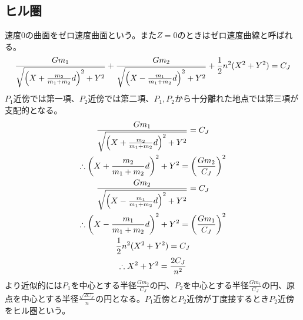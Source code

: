 	\subsection{ヒル圏}%
		速度0の曲面をゼロ速度曲面という。また$Z = 0$のときはゼロ速度曲線と呼ばれる。
		\begin{align*}
			\frac{Gm_1}{\sqrt{\left(X + \frac{m_2}{m_1 + m_2}d \right)^2 + Y^2}} + \frac{Gm_2}{\sqrt{\left(X - \frac{m_1}{m_1 + m_2}d \right)^2 + Y^2}} + \frac{1}{2}n^2(X^2 + Y^2) = C_J\\
		\end{align*}
		$P_1$近傍では第一項、$P_2$近傍では第二項、$P_1,P_2$から十分離れた地点では第三項が支配的となる。
		\begin{gather*}
			\frac{Gm_1}{\sqrt{\left(X + \frac{m_2}{m_1 + m_2}d \right)^2 + Y^2}} = C_J\\
			\therefore \left(X + \frac{m_2}{m_1 + m_2}d \right)^2 + Y^2 = \left(\frac{Gm_2}{C_J} \right)^2\\
			\frac{Gm_2}{\sqrt{\left(X - \frac{m_1}{m_1 + m_2}d \right)^2 + Y^2}} = C_J\\
			\therefore \left(X - \frac{m_1}{m_1 + m_2}d \right)^2 + Y^2 = \left(\frac{Gm_1}{C_J} \right)^2\\
			\frac{1}{2}n^2(X^2 + Y^2) = C_J\\
			\therefore X^2 + Y^2 = \frac{2C_J}{n^2}
		\end{gather*}
		より近似的には$P_1$を中心とする半径$\frac{Gm_2}{C_J}$の円、$P_2$を中心とする半径$\frac{Gm_1}{C_J}$の円、原点を中心とする半径$\frac{\sqrt{2C_J}}{n}$の円となる。$P_1$近傍と$P_2$近傍が丁度接するとき$P_2$近傍をヒル圏という。
